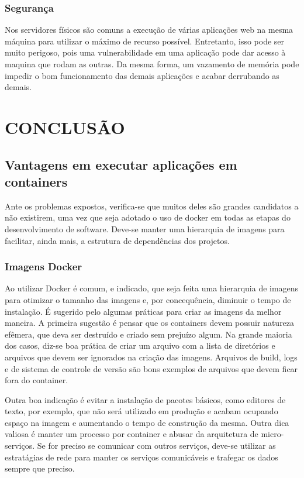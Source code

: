 \documentclass[
	12pt,				%
	openright,			%
	oneside,			%
	a4paper,			%
	chapter=TITLE,		%
	section=TITLE,		%
	english,			%
	french,				%
	spanish,			%
	brazil				%
	]{abntex2}
\begin{document}
\subsection{Segurança}

Nos servidores físicos são comuns a execução de várias aplicações web na mesma máquina para utilizar o máximo de recurso possível. Entretanto, isso pode ser muito perigoso, pois uma vulnerabilidade em uma aplicação pode dar acesso à maquina que rodam as outras. Da mesma forma, um vazamento de memória pode impedir o bom funcionamento das demais aplicações e acabar derrubando as demais.


\chapter{CONCLUSÃO}

\section{Vantagens em executar aplicações em containers}

Ante os problemas expostos, verifica-se que muitos deles são grandes candidatos a não existirem, uma vez que seja adotado o uso de docker em todas as etapas do desenvolvimento de software. Deve-se manter uma hierarquia de imagens para facilitar, ainda mais, a estrutura de dependências dos projetos.

\subsection{Imagens Docker}

Ao utilizar Docker é comum, e indicado, que seja feita uma hierarquia de imagens para otimizar o tamanho das imagens e, por concequência, diminuir o tempo de instalação. É sugerido pelo  algumas práticas para criar as imagens da melhor maneira. A primeira sugestão é pensar que os containers devem possuir natureza efêmera, que deva ser destruído e criado sem prejuízo algum. Na grande maioria dos casos, diz-se boa prática de criar um arquivo com a lista de diretórios e arquivos que devem ser ignorados na criação das imagens. Arquivos de build, logs e de sistema de controle de versão são bons exemplos de arquivos que devem ficar fora do container.

Outra boa indicação é evitar a instalação de pacotes básicos, como editores de texto, por exemplo, que não será utilizado em produção e acabam ocupando espaço na imagem e aumentando o tempo de construção da mesma. Outra dica valiosa é manter um processo por container e abusar da arquitetura de micro-serviços. Se for preciso se comunicar com outros serviços, deve-se utilizar as estratágias de rede para manter os serviços comunicáveis e trafegar os dados sempre que preciso.
\end{document}
